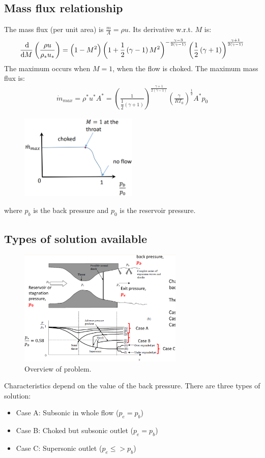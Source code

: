 \documentclass[class=report, crop=false, 12pt,a4paper]{standalone}
\begin{document}
\subsection{Mass flux relationship}
The mass flux (per unit area) is $\frac{m}{A} = \rho u$. Its derivative w.r.t. $M$ is:
\begin{gather}
    \frac{\dif}{\dif M}\left(\frac{\rho u}{\rho_* u_*}\right) = \left(1-M^2\right)\left(1 + \frac{1}{2}\left(\gamma - 1\right)M^2\right)^{-\frac{\gamma -3}{2\left(\gamma - 1\right)}}\left(\frac{1}{2}\left(\gamma + 1\right)\right)^{\frac{\gamma + 1}{2\left(\gamma -1\right)}}
\end{gather}
The maximum occurs when $M=1$, when the flow is choked. The maximum mass flux is:
\begin{gather}
    \dot{m}_{max} = \rho^* u^* A^* = \left(\frac{1}{\dfrac{1}{2}\left(\gamma + 1\right)}\right)^{\frac{\gamma + 1}{2\left(\gamma -1\right)}}\left(\frac{\gamma}{RT_0}\right)^{\frac{1}{2}}A^* p_0
\end{gather}
\begin{figure}[H]
    \centering
    \includegraphics[width = 0.5\textwidth]{../img/diagram55.png}
    \caption{}
\end{figure}
where $p_b$ is the back pressure and $p_0$ is the reservoir pressure.
\subsection{Types of solution available}
\begin{figure}[H]
    \centering
    \includegraphics[width = 0.7\textwidth]{../img/diagram56.png}
    \caption{Overview of problem.}
\end{figure}
Characteristics depend on the value of the back pressure. There are three types of solution:
\begin{itemize}[noitemsep]
    \item Case A: Subsonic in whole flow ($p_e = p_b$)
    \item Case B: Choked but subsonic outlet ($p_e = p_b$)
    \item Case C: Supersonic outlet ($p_e \leq > p_b$)
\end{itemize}
\end{document}
